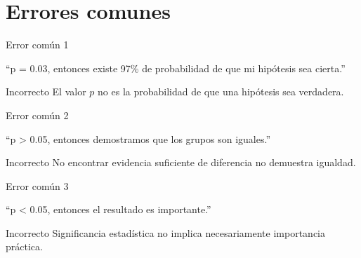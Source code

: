 \documentclass[aspectratio=169,11pt]{beamer}
\begin{document}
\section{Errores comunes}

\begin{frame}{Error común 1}

\begin{center}

\Large
``p = 0.03, entonces existe 97\% de probabilidad de que mi hipótesis sea cierta.''

\end{center}

\vspace{0.6cm}

\begin{alertblock}{Incorrecto}
El valor $p$ no es la probabilidad de que una hipótesis sea verdadera.
\end{alertblock}

\end{frame}


\begin{frame}{Error común 2}

\begin{center}

\Large
``p > 0.05, entonces demostramos que los grupos son iguales.''

\end{center}

\vspace{0.6cm}

\begin{alertblock}{Incorrecto}
No encontrar evidencia suficiente de diferencia no demuestra igualdad.
\end{alertblock}

\end{frame}


\begin{frame}{Error común 3}

\begin{center}

\Large
``p < 0.05, entonces el resultado es importante.''

\end{center}

\vspace{0.6cm}

\begin{alertblock}{Incorrecto}
Significancia estadística no implica necesariamente importancia práctica.
\end{alertblock}

\end{frame}
\end{document}
